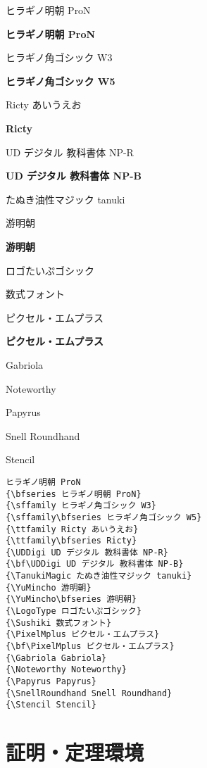 \documentclass[xelatex,ja=standard,b5j,8pt,magstyle=nomag*,japaram={units}]{bxjsarticle}
\begin{document}
\begin{multicols}{2}
    

ヒラギノ明朝 ProN

{\bfseries ヒラギノ明朝 ProN}

{\sffamily ヒラギノ角ゴシック W3}

{\sffamily\bfseries ヒラギノ角ゴシック W5}

{\ttfamily Ricty あいうえお}

{\ttfamily\bfseries Ricty}

{\UDDigi UD デジタル 教科書体 NP-R}

{\bf\UDDigi UD デジタル 教科書体 NP-B}

{\TanukiMagic たぬき油性マジック tanuki}

{\YuMincho 游明朝}

{\YuMincho\bfseries 游明朝}

{\LogoType ロゴたいぷゴシック}

{\Sushiki 数式フォント}

{\PixelMplus ピクセル・エムプラス}

{\bf\PixelMplus ピクセル・エムプラス}


{\Gabriola Gabriola}

{\Noteworthy Noteworthy}

{\Papyrus Papyrus}

{\SnellRoundhand Snell Roundhand}

{\Stencil Stencil}

\columnbreak

\begin{lstlisting}
ヒラギノ明朝 ProN
{\bfseries ヒラギノ明朝 ProN}
{\sffamily ヒラギノ角ゴシック W3}
{\sffamily\bfseries ヒラギノ角ゴシック W5}
{\ttfamily Ricty あいうえお}
{\ttfamily\bfseries Ricty}
{\UDDigi UD デジタル 教科書体 NP-R}
{\bf\UDDigi UD デジタル 教科書体 NP-B}
{\TanukiMagic たぬき油性マジック tanuki}
{\YuMincho 游明朝}
{\YuMincho\bfseries 游明朝}
{\LogoType ロゴたいぷゴシック}
{\Sushiki 数式フォント}
{\PixelMplus ピクセル・エムプラス}
{\bf\PixelMplus ピクセル・エムプラス}
{\Gabriola Gabriola}
{\Noteworthy Noteworthy}
{\Papyrus Papyrus}
{\SnellRoundhand Snell Roundhand}
{\Stencil Stencil}
\end{lstlisting}


\end{multicols}
\fi

\newpage
\section{証明・定理環境}
\end{document}
